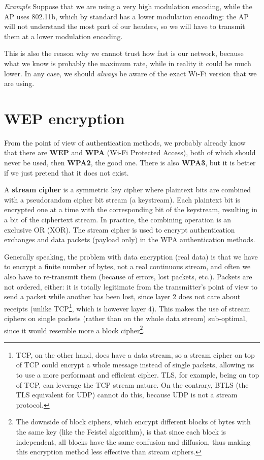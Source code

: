 \vspace{0.5em}

\emph{Example} Suppose that we are using a very high modulation encoding, while the AP uses 802.11b, which by standard has a lower modulation encoding: the AP will not understand the most part of our headers, so we will have to transmit them at a lower modulation encoding.

\vspace{0.5em}

This is also the reason why we cannot trust how fast is our network, because what we know is probably the maximum rate, while in reality it could be much lower. In any case, we should \textit{always} be aware of the exact Wi-Fi version that we are using.


\section{WEP encryption}
From the point of view of authentication methods, we probably already know that there are \textbf{WEP} and \textbf{WPA} (Wi-Fi Protected Access), both of which should never be used, then \textbf{WPA2}, the good one. There is also \textbf{WPA3}, but it is better if we just pretend that it does not exist.

A \textbf{stream cipher} is a symmetric key cipher where plaintext bits are combined with a pseudorandom cipher bit stream (a keystream). Each plaintext bit is encrypted one at a time with the corresponding bit of the keystream, resulting in a bit of the ciphertext stream. In practice, the combining operation is an exclusive OR (XOR). The stream cipher is used to encrypt authentication exchanges and data packets (payload only) in the WPA authentication methods. 

Generally speaking, the problem with data encryption (real data) is that we have to encrypt a finite number of bytes, not a real continuous stream, and often we also have to re-transmit them (because of errors, lost packets, etc.). Packets are not ordered, either: it is totally legitimate from the transmitter's point of view to send a packet while another has been lost, since layer 2 does not care about receipts (unlike TCP\footnote{TCP, on the other hand, does have a data stream, so a stream cipher on top of TCP could encrypt a whole message instead of single packets, allowing us to use a more performant and efficient cipher. TLS, for example, being on top of TCP, can leverage the TCP stream nature. On the contrary, BTLS (the TLS equivalent for UDP) cannot do this, because UDP is not a stream protocol.}, which is however layer 4). This makes the use of stream ciphers on single packets (rather than on the whole data stream) sub-optimal, since it would resemble more a block cipher\footnote{The downside of block ciphers, which encrypt different blocks of bytes with the same key (like the Feistel algorithm), is that since each block is independent, all blocks have the same confusion and diffusion, thus making this encryption method less effective than stream ciphers.}.

